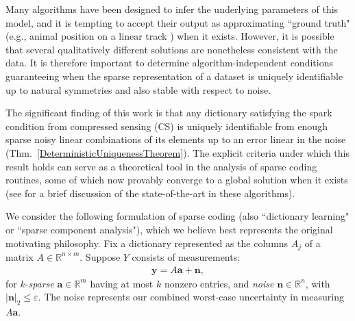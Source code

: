 \documentclass[journal, twocolumn]{IEEEtran}
\begin{document}
Many algorithms have been designed to infer the underlying parameters of this model, and it is tempting to accept their output as approximating ``ground truth" (e.g., animal position on a linear track \cite{Agarwal14}) when it exists. However, it is possible that several qualitatively different solutions are nonetheless consistent with the data. It is therefore important to determine algorithm-independent conditions guaranteeing when the sparse representation of a dataset is uniquely identifiable up to natural symmetries and also stable with respect to noise. 

The significant finding of this work is that any dictionary satisfying the spark condition from compressed sensing (CS) is uniquely identifiable from enough sparse noisy linear combinations of its elements up to an error linear in the noise (Thm.~\ref{DeterministicUniquenessTheorem}).
The explicit criteria under which this result holds can serve as a theoretical tool in the analysis of sparse coding routines, some of which now provably converge to a global solution when it exists (see \cite[Sec.~I-E]{Sun16} for a brief discussion of the state-of-the-art in these algorithms). 

We consider the following formulation of sparse coding (also ``dictionary learning" or ``sparse component analysis"), which we believe best represents the original motivating philosophy. Fix a dictionary represented as the columns $A_j$ of a matrix $A \in \mathbb R^{n \times m}$. Suppose  $Y$ consists of measurements:
\begin{align}\label{LinearModel}
\mathbf{y} = A\mathbf{a} + \mathbf{n},
\end{align}
for $k$-\emph{sparse} $\mathbf{a} \in \mathbb{R}^m$ having at most $k$ nonzero entries, and \emph{noise} $\mathbf{n} \in \mathbb{R}^n$, with $|\mathbf{n}|_2 \leq \varepsilon$. The noise represents our combined worst-case uncertainty in  measuring $A\mathbf{a}$.
\end{document}
